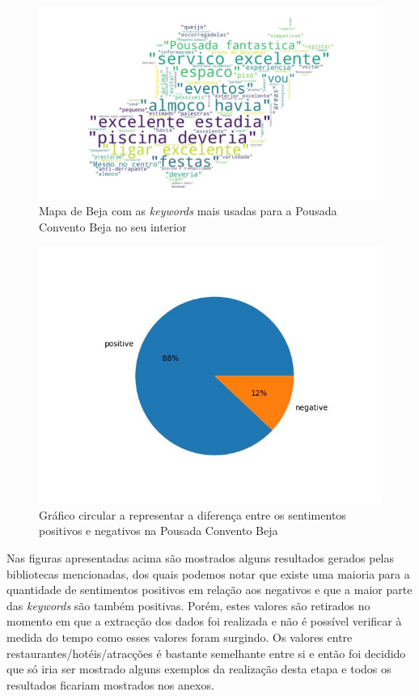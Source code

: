 \begin{figure}[!htb]
\centering
\includegraphics[width=14cm]{figuras/TripAdvisor/Hotels/hotel0_keywordcloud.jpeg}
\caption{Mapa de Beja com as \textit{keywords} mais usadas para a Pousada Convento Beja no seu interior}
\label{fig:top100keywcpcbeja}
\end{figure}

\begin{figure}[!htb]
\centering
\includegraphics[width=14cm]{figuras/TripAdvisor/Hotels/hotel0_sentiments.jpeg}
\caption{Gráfico circular a representar a diferença entre os sentimentos positivos e negativos na Pousada Convento Beja}
\label{fig:sentpercetpcbeja}
\end{figure}

Nas figuras apresentadas acima são mostrados alguns resultados gerados pelas bibliotecas mencionadas, dos quais podemos notar que existe uma maioria para a quantidade de sentimentos positivos em relação aos negativos e que a maior parte das \textit{keywords} são também positivas. Porém, estes valores são retirados no momento em que a extracção dos dados foi realizada e não é possível verificar à medida do tempo como esses valores foram surgindo. Os valores entre restaurantes/hotéis/atracções é bastante semelhante entre si e então foi decidido que só iria ser mostrado alguns exemplos da realização desta etapa e todos os resultados ficariam mostrados nos anexos.

